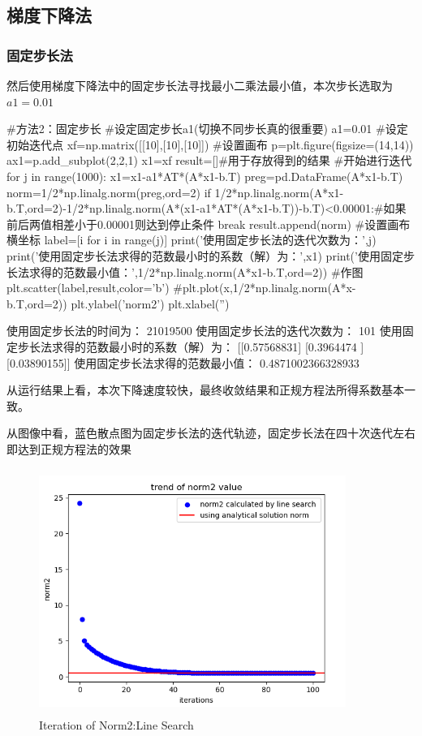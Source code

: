 \documentclass[12pt, a4paper, oneside, fontset=windows]{ctexart}
\begin{document}
\subsection{梯度下降法}
\subsubsection{固定步长法}
然后使用梯度下降法中的固定步长法寻找最小二乘法最小值，本次步长选取为$a1 = 0.01$
\begin{python}
    #方法2：固定步长
    #设定固定步长a1(切换不同步长真的很重要)
    a1=0.01
    #设定初始迭代点
    xf=np.matrix([[10],[10],[10]])
    #设置画布
    p=plt.figure(figsize=(14,14))
    ax1=p.add_subplot(2,2,1)
    x1=xf
    result=[]#用于存放得到的结果
    #开始进行迭代
    for j in range(1000):
        x1=x1-a1*AT*(A*x1-b.T)
        preg=pd.DataFrame(A*x1-b.T)
        norm=1/2*np.linalg.norm(preg,ord=2)
        if 1/2*np.linalg.norm(A*x1-b.T,ord=2)-1/2*np.linalg.norm(A*(x1-a1*AT*(A*x1-b.T))-b.T)<0.00001:#如果前后两值相差小于0.00001则达到停止条件
            break    
        result.append(norm)
    #设置画布横坐标
    label=[i for i in range(j)]
    print('使用固定步长法的迭代次数为：\n',j)
    print('使用固定步长法求得的范数最小时的系数（解）为：\n',x1)
    print('使用固定步长法求得的范数最小值：\n',1/2*np.linalg.norm(A*x1-b.T,ord=2))
    #作图
    plt.scatter(label,result,color='b')
    #plt.plot(x,1/2*np.linalg.norm(A*x-b.T,ord=2))
    plt.ylabel('norm2')
    plt.xlabel('')
\end{python}
\begin{python}
    使用固定步长法的时间为：
    21019500
   使用固定步长法的迭代次数为：
    101
   使用固定步长法求得的范数最小时的系数（解）为：
    [[0.57568831]
    [0.3964474 ]
    [0.03890155]]
   使用固定步长法求得的范数最小值：
    0.4871002366328933
\end{python}

从运行结果上看，本次下降速度较快，最终收敛结果和正规方程法所得系数基本一致。

从图像中看，蓝色散点图为固定步长法的迭代轨迹，固定步长法在四十次迭代左右即达到正规方程法的效果
\begin{figure}[H]
    \centering
    \includegraphics[width=10cm,height=8cm]{Analytical Solution Norm2.png}
    \caption{Iteration of Norm2:Line Search}
\end{figure}
\end{document}

